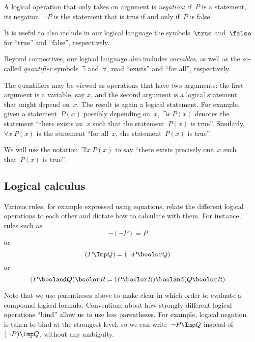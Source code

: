 A logical operation that only takes on argument is \emph{negation}: if~$P$ is a statement, its negation~$\lnot P$ is the statement that is true if and only if~$P$ is false.

It is useful to also include in our logical language the symbols~$\true$ and~$\false$ for ``true'' and ``false'', respectively.

Beyond connectives, our logical language also includes \emph{variables}, as well as the so-called \emph{quantifier} symbols~$\exists$ and~$\forall$, read ``exists'' and ``for all'', respectively.

The quantifiers may be viewed as operations that have two arguments: the first argument is a variable, say $x$, and the second argument is a logical statement that might depend on~$x$.
The result is again a logical statement.
For example, given a statement~$P(x)$ possibly depending on~$x$,~$\exists x \ P(x)$ denotes the statement ``there exists an~$x$ such that the statement~$P(x)$ is true''.
Similarly,~$\forall x \ P(x)$ is the statement ``for all~$x$, the statement~$P(x)$ is true''.

We will use the notation~$\exists!
    x \ P(x)$ to say ``there exists precisely one~$x$ such that~$P(x)$ is true''.

\subsection{Logical calculus}

Various rules, for example expressed using equations, relate the different logical operations to each other and dictate how to calculate with them.
For instance, rules such as
\begin{equation*}
    \lnot (\lnot P) = P
\end{equation*}
or
\begin{equation*}
    (P \Imp Q) = (\lnot P \boolor Q)
\end{equation*}
or
\begin{equation*}
    (P \booland Q) \boolor R = (P \boolor R) \booland (Q \boolor R)
\end{equation*}

Note that we use parentheses above to make clear in which order to evaluate a compound logical formula.
Conventions about how strongly different logical operations ``bind'' allow us to use less parentheses.
For example, logical negation is taken to bind at the strongest level, so we can write~$\lnot P \Imp Q$ instead of~$(\lnot P) \Imp Q$, without any ambiguity.


